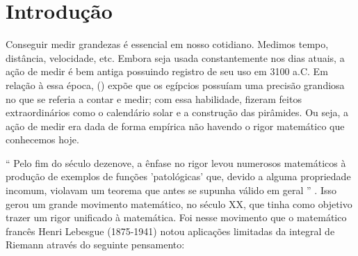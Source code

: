 




\chapter{Introdução}
\label{chap:intro}

    Conseguir medir grandezas é essencial em nosso cotidiano.
    Medimos tempo, distância, velocidade, etc.
    Embora seja usada constantemente nos dias atuais, a ação de medir é bem antiga possuindo registro de seu uso em 3100 a.C.
    Em relação à essa época, \citeauthor{boy}(\citeyear{boy}) expõe que os egípcios possuíam uma precisão grandiosa no que se referia a contar e medir;
    com essa habilidade, fizeram feitos extraordinários como o calendário solar e a construção das pirâmides.
    Ou seja, a ação de medir era dada de forma empírica não havendo o rigor matemático que conhecemos hoje.
   
    \enquote{
    	Pelo fim do século dezenove, a ênfase no rigor levou numerosos matemáticos à produção de exemplos de funções 'patológicas' que, devido a alguma propriedade incomum, violavam um teorema que antes se supunha válido em geral
    } \cite[p.415]{boy}.
    Isso gerou um grande movimento matemático, no século XX, que tinha como objetivo trazer um rigor unificado à matemática.
    Foi nesse movimento que o matemático francês Henri Lebesgue (1875-1941) notou aplicações limitadas da integral de Riemann através do seguinte pensamento:
    
